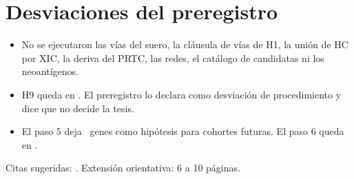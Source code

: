 \section{Desviaciones del preregistro}
\begin{itemize}
\item No se ejecutaron las vías del suero, la cláusula de vías de H1, la unión de HC por XIC, la deriva del PRTC, las redes, el catálogo de candidatas ni los neoantígenos.
\item H9 queda en \HnueveEstado. El preregistro lo declara como desviación de procedimiento y dice que no decide la tesis.
\item El paso 5 deja \PrioriPasoCinco\ genes como hipótesis para cohortes futuras. El paso 6 queda en \PrioriPasoSeis.
\end{itemize}
Citas sugeridas: \cite{rai2025,xiang2026,hembrough2026,lakens2017,mccarthy2009}.
Extensión orientativa: 6 a 10 páginas.
